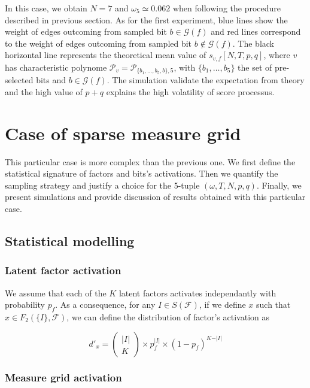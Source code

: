 \documentclass[a4paper, 11pt]{article}
\begin{document}
In this case, we obtain $N=7$ and $\omega_5 \simeq 0.062$ when following the procedure described in previous section. As for the first experiment, blue lines show the weight of edges outcoming from sampled bit $b \in \mathcal{G}(f)$ and red lines correspond to the weight of edges outcoming from sampled bit $b \notin \mathcal{G}(f)$. The black horizontal line represents the theoretical mean value of $s_{v, f}[N, T, p, q]$, where $v$ has characteristic polynome $\mathcal{P}_v = \mathcal{P}_{\{b_1, \ldots, b_5, b\}, 5}$, with $\{b_1, \ldots, b_5\}$ the set of pre-selected bits and $b \in \mathcal{G}(f)$. The simulation validate the expectation from theory and the high value of $p+q$ explains the high volatility of score processus.

\section{Case of sparse measure grid}

This particular case is more complex than the previous one. We first define the statistical signature of factors and bits's activations. Then we quantify the sampling strategy and justify a choice for the 5-tuple $(\omega, T, N, p, q)$. Finally, we present simulations and provide discussion of results obtained with this particular case.

\subsection{Statistical modelling}


\subsubsection*{Latent factor activation}

We assume that each of the $K$ latent factors activates independantly with probability $p_f$. As a consequence, for any $I \in S(\mathcal{F})$, if we define $x$ such that $x \in F_2 (\{I\}, \mathcal{F})$, we can define the distribution of factor's activation as 

\begin{equation*}
d'_x = \begin{pmatrix} \vert I \vert \\ K \end{pmatrix} \times p_f^{\vert I \vert} \times (1-p_f)^{K-\vert I \vert} 
\end{equation*}


\subsubsection*{Measure grid activation}
\end{document}
